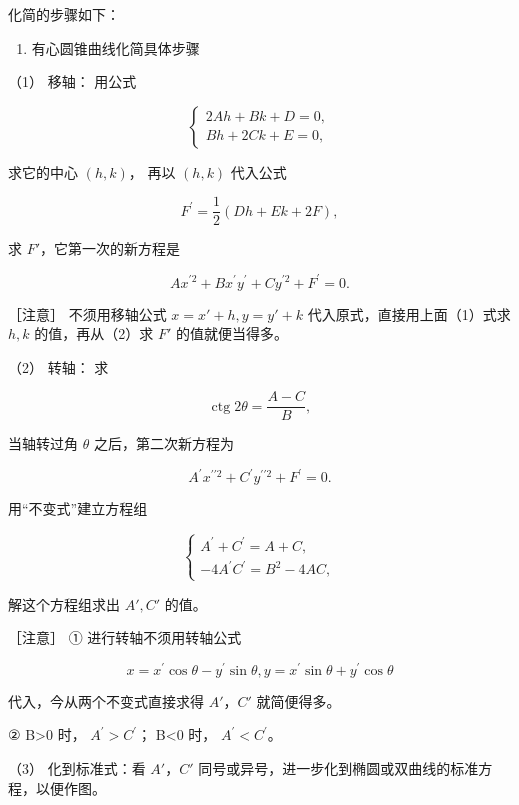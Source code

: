 化简的步骤如下：

\begin{enumerate}
\def\labelenumi{\arabic{enumi}.}
\tightlist
\item
  有心圆锥曲线化简具体步骤
\end{enumerate}

（1） 移轴： 用公式

\[
\left\{ \begin{array}{l} 2 A h + B k + D = 0, \\ B h + 2 C k + E = 0, \end{array} \right. \tag {1}
\]

求它的中心 \((h, k)\)， 再以 \((h, k)\) 代入公式

\[
F^{\prime} = \frac {1}{2} (D h + E k + 2 F), \tag {2}
\]

求 \(F'\)，它第一次的新方程是

\[
A x^{\prime 2} + B x^{\prime} y^{\prime} + C y^{\prime 2} + F^{\prime} = 0. \tag {b}
\]

［注意］ 不须用移轴公式 \(x = x' + h, y = y' + k\)
代入原式，直接用上面（1）式求 \(h, k\) 的值，再从（2）求 \(F'\)
的值就便当得多。

（2） 转轴： 求

\[
\operatorname{ctg} 2 \theta = \frac {A - C}{B}, \tag {3}
\]

当轴转过角 \(\theta\) 之后，第二次新方程为

\[
A^{\prime} x^{\prime \prime 2} + C^{\prime} y^{\prime \prime 2} + F^{\prime} = 0. \tag {c}
\]

用``不变式''建立方程组

\[
\left\{ \begin{array}{l} A^{\prime} + C^{\prime} = A + C, \\ - 4 A^{\prime} C^{\prime} = B^{2} - 4 AC, \end{array} \right. \tag {4}
\]

解这个方程组求出 \(A', C'\) 的值。

［注意］ ① 进行转轴不须用转轴公式

\[
x = x^{\prime} \cos \theta - y^{\prime} \sin \theta, y = x^{\prime} \sin \theta + y^{\prime} \cos \theta
\]

代入，今从两个不变式直接求得 \(A'\)，\(C'\) 就简便得多。

② B\textgreater0 时， \(A^{\prime}>C^{\prime}\)； B\textless0 时，
\(A^{\prime}<C^{\prime}\)。

（3） 化到标准式：看 \(A'\)，\(C'\)
同号或异号，进一步化到椭圆或双曲线的标准方程，以便作图。


